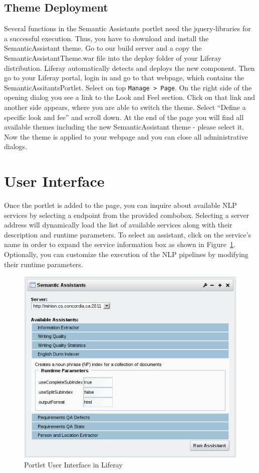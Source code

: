 \subsection{Theme Deployment}
Several functions in the Semantic Assistants portlet need the jquery-libraries for a successful execution. Thus, you have to download and install the SemanticAssistant theme. Go to our build server and a copy the SemanticAssistantTheme.war file into the deploy folder of your Liferay distribution. Liferay automatically detects and deploys the new component. Then go to your Liferay portal, login in and go to that webpage, which contains the SemanticAssitantsPortlet. Select on top \texttt{Manage \textgreater~Page}. On the right side of the opening dialog you see a link to the Look and Feel section. Click on that link and another side appears, where you are able to switch the theme. Select ``Define a specific look and fee'' and scroll down. At the end of the page you will find all available themes including the new SemanticAssistant theme - please select it. Now the theme is applied to your webpage and you can close all administrative dialogs.

\section{User Interface}
Once the portlet is added to the page, you can inquire about available NLP services by selecting a \sa endpoint from the provided combobox. Selecting a server address will dynamically load the list of available services along with their description and runtime parameters. To select an assistant, click on the service's name in order to expand the service information box as shown in Figure~\ref{fig:liferay_sa_portlet}. Optionally, you can customize the execution of the NLP pipelines by modifying their runtime parameters.

\begin{figure}
\centering
\includegraphics[scale=0.6]{pictures/liferay_sa_portlet.png}
\caption{\sa Portlet User Interface in Liferay}
\label{fig:liferay_sa_portlet}
\end{figure}

